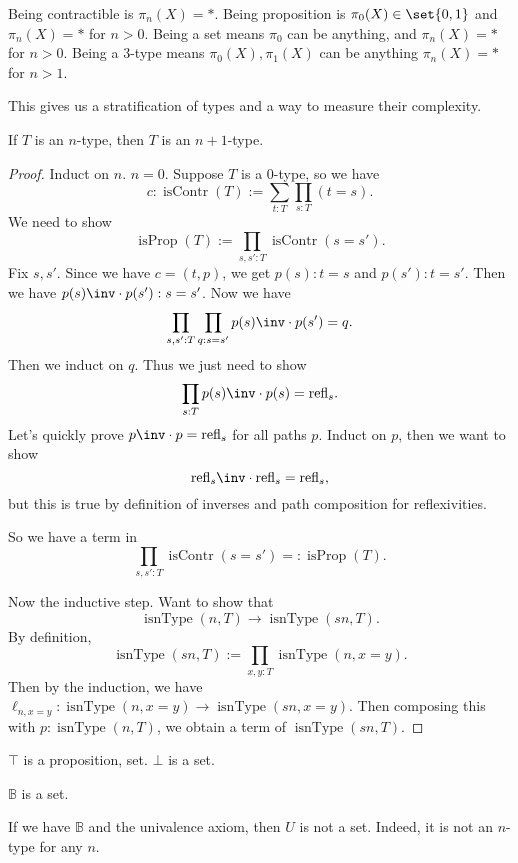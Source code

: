 \documentclass{article}
\newcommand\pred[1]{\operatorname{#1}}
\newcommand\refl{\mathrm{refl}}
\newcommand\BB{\mathbb{B}}
\newcommand\isContr{\pred{isContr}}
\newcommand\isProp{\pred{isProp}}
\newcommand\isnType{\pred{isnType}}
\begin{document}
Being contractible is $\pi_n(X)=*$.
Being proposition is $\pi_0(X) \in \set{0,1}$ and 
$\pi_n(X)=*$ for $n>0$.
Being a set means $\pi_0$ can be anything, and 
$\pi_n(X)=*$ for $n>0$.
Being a 3-type means $\pi_0(X),\pi_1(X)$ can be anything
$\pi_n(X)=*$ for $n>1$.

This gives us a stratification of types and a way to measure 
their complexity.

\begin{proposition}
    If $T$ is an $n$-type, then $T$ is an $n+1$-type.
\end{proposition}

\begin{proof}
    Induct on $n$.
    $n=0$. Suppose $T$ is a $0$-type, so we have 
    \[ c:\isContr(T) := \sum_{t:T}\prod_{s:T}(t=s).\]
    We need to show 
    \[ \isProp(T):=\prod_{s,s':T} \isContr(s=s').\]
    Fix $s,s'$. Since we have $c=(t,p)$, we get 
    $p(s):t=s$ and $p(s'):t=s'$. Then we have 
    $p(s)\inv \cdot p(s') : s=s'$.
    Now we have 
    \[\prod_{s,s':T} \prod_{q:s=s'} p(s)\inv \cdot p(s') = q.\]
    Then we induct on $q$. Thus we just need to show 
    \[ \prod_{s:T} p(s)\inv \cdot p(s) = \refl_s. \]
    Let's quickly prove $p\inv \cdot p = \refl_s$ 
    for all paths $p$.
    Induct on $p$, then we want to show
    \[ \refl_s\inv \cdot \refl_s = \refl_s,\]
    but this is true by definition of inverses and path 
    composition for reflexivities.

    So we have a term in 
    \[\prod_{s,s':T} \isContr(s=s') =: \isProp(T).\]

    Now the inductive step. Want to show that 
    \[ \isnType(n,T) \to \isnType(sn,T).\]
    By definition, \[\isnType(sn,T) 
    := \prod_{x,y:T} \isnType(n,x=y).\]
    Then by the induction, we have 
    $\ell_{n,x=y} : \isnType(n,x=y) \to \isnType(sn,x=y)$.
    Then composing this with 
    $p:\isnType(n,T)$, we obtain a term of 
    $\isnType(sn,T)$.
\end{proof}

\begin{corollary}
    $\top$ is a proposition, set. $\bot$ is a set.
\end{corollary}

\begin{proposition}
    $\BB$ is a set.
\end{proposition}

\begin{proposition}
    If we have $\BB$ and the univalence axiom, then 
    $U$ is not a set. Indeed, it is not an $n$-type for 
    any $n$.
\end{proposition}
\end{document}

